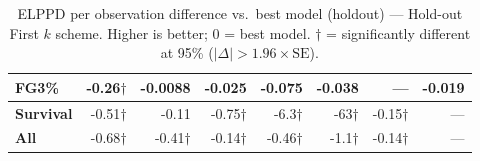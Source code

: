 \documentclass{article}
\begin{document}
\begin{table}[H]
{\begin{tabular}{lrrrrrrr}
FG3\% & -0.26$\dagger$ & -0.0088 & -0.025 & -0.075 & -0.038 & --- & -0.019 \\[2pt]
\midrule
\textbf{Survival} & -0.51$\dagger$ & -0.11 & -0.75$\dagger$ & -6.3$\dagger$ & -63$\dagger$ & -0.15$\dagger$ & --- \\
\midrule
\textbf{All} & -0.68$\dagger$ & -0.41$\dagger$ & -0.14$\dagger$ & -0.46$\dagger$ & -1.1$\dagger$ & -0.14$\dagger$ & --- \\
\bottomrule
\end{tabular}
}
\caption{ELPPD per observation difference vs.\ best model (holdout) --- Hold-out First $k$ scheme. Higher is better; 0 = best model. $\dagger$ = significantly different at 95\% ($|\Delta|>1.96\times\mathrm{SE}$).}
\label{tab:elppd_holdout_first_k}
\end{table}
\end{document}
